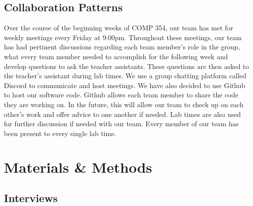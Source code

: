 \documentclass[titlepage]{article}
\begin{document}
    \subsection{Collaboration Patterns}
     Over the course of the beginning weeks of COMP 354, our team has met for weekly meetings every Friday at 9:00pm. Throughout these meetings, our team has had pertinent discussions regarding each team member’s role in the group, what every team member needed to accomplish for the following week and develop questions to ask the teacher assistants. These questions are then asked to the teacher’s assistant during lab times.
    \newline We use a group chatting platform called Discord to communicate and host meetings. We have also decided to use Github to host our software code. Github allows each team member to share the code they are working on. In the future, this will allow our team to check up on each other’s work and offer advice to one another if needed. Lab times are also used for further discussion if needed with our team. Every member of our team has been present to every single lab time.

\section{Materials \& Methods}
        \subsection{Interviews}
\end{document}
